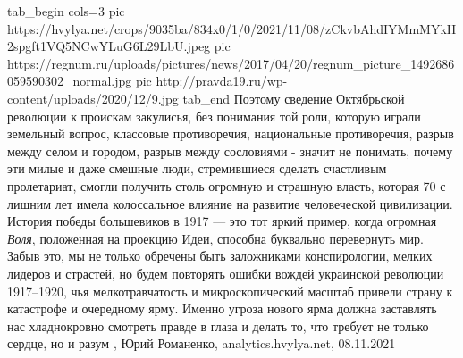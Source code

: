 \ifcmt
  tab_begin cols=3
     pic https://hvylya.net/crops/9035ba/834x0/1/0/2021/11/08/zCkvbAhdIYMmMYkH2spgft1VQ5NCwYLuG6L29LbU.jpeg
     pic https://regnum.ru/uploads/pictures/news/2017/04/20/regnum_picture_1492686059590302_normal.jpg
		 pic http://pravda19.ru/wp-content/uploads/2020/12/9.jpg
  tab_end
\fi
Поэтому сведение Октябрьской революции к проискам закулисья, без понимания той
роли, которую играли земельный вопрос, классовые противоречия, национальные
противоречия, разрыв между селом и городом, разрыв между сословиями - значит не
понимать, почему эти милые и даже смешные люди, стремившиеся сделать счастливым
пролетариат, смогли получить столь огромную и страшную власть, которая 70 с
лишним лет имела колоссальное влияние на развитие человеческой цивилизации.
История победы большевиков в 1917 — это тот яркий пример, когда огромная \emph{Воля},
положенная на проекцию Идеи, способна буквально перевернуть мир. Забыв это, мы
не только обречены быть заложниками конспирологии, мелких лидеров и страстей,
но будем повторять ошибки вождей украинской революции 1917–1920, чья
мелкотравчатость и микроскопический масштаб привели страну к катастрофе и
очередному ярму. Именно угроза нового ярма должна заставлять нас хладнокровно
смотреть правде в глаза и делать то, что требует не только сердце, но и разум
, 
Юрий Романенко, analytics.hvylya.net, 08.11.2021
